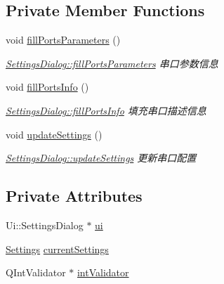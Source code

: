 \subsection*{Private Member Functions}
\begin{DoxyCompactItemize}
\item 
void \mbox{\hyperlink{class_settings_dialog_ac2a0ea7c05f7cb98e3bc2474981bc5e7}{fill\+Ports\+Parameters}} ()
\begin{DoxyCompactList}\small\item\em \mbox{\hyperlink{class_settings_dialog_ac2a0ea7c05f7cb98e3bc2474981bc5e7}{Settings\+Dialog\+::fill\+Ports\+Parameters}} 串口参数信息 \end{DoxyCompactList}\item 
void \mbox{\hyperlink{class_settings_dialog_a9e2b682d0cfe9f8a16b7912f495aa034}{fill\+Ports\+Info}} ()
\begin{DoxyCompactList}\small\item\em \mbox{\hyperlink{class_settings_dialog_a9e2b682d0cfe9f8a16b7912f495aa034}{Settings\+Dialog\+::fill\+Ports\+Info}} 填充串口描述信息 \end{DoxyCompactList}\item 
void \mbox{\hyperlink{class_settings_dialog_a349c9a5d2af7bb8001df096b43786d2d}{update\+Settings}} ()
\begin{DoxyCompactList}\small\item\em \mbox{\hyperlink{class_settings_dialog_a349c9a5d2af7bb8001df096b43786d2d}{Settings\+Dialog\+::update\+Settings}} 更新串口配置 \end{DoxyCompactList}\end{DoxyCompactItemize}
\subsection*{Private Attributes}
\begin{DoxyCompactItemize}
\item 
Ui\+::\+Settings\+Dialog $\ast$ \mbox{\hyperlink{class_settings_dialog_aef76017ec1056d6e88e6bb48cdf73b0f}{ui}}
\item 
\mbox{\hyperlink{struct_settings_dialog_1_1_settings}{Settings}} \mbox{\hyperlink{class_settings_dialog_a9500689af503b7213b98d576ef8fa1e1}{current\+Settings}}
\item 
Q\+Int\+Validator $\ast$ \mbox{\hyperlink{class_settings_dialog_a925d4c1575508422a40fddb01c3eb1f4}{int\+Validator}}
\end{DoxyCompactItemize}


